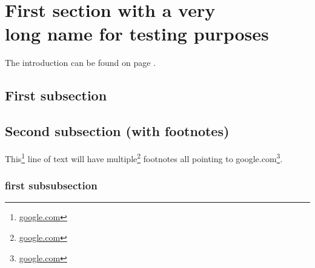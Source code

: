 \lipsum[1]

\section{First section with a very \\long name for testing purposes}
The introduction can be found on page \pageref{sec:introduction}.
\subsection{First subsection}
\lipsum[1-3]

\subsection{Second subsection (with footnotes)}
This\footnote{\url{google.com}} line of text will have multiple\footnote{\url{google.com}} footnotes all pointing to google.com\footnote{\url{google.com}}.

\subsubsection{first subsubsection}
\lipsum[1]
\cite{first}